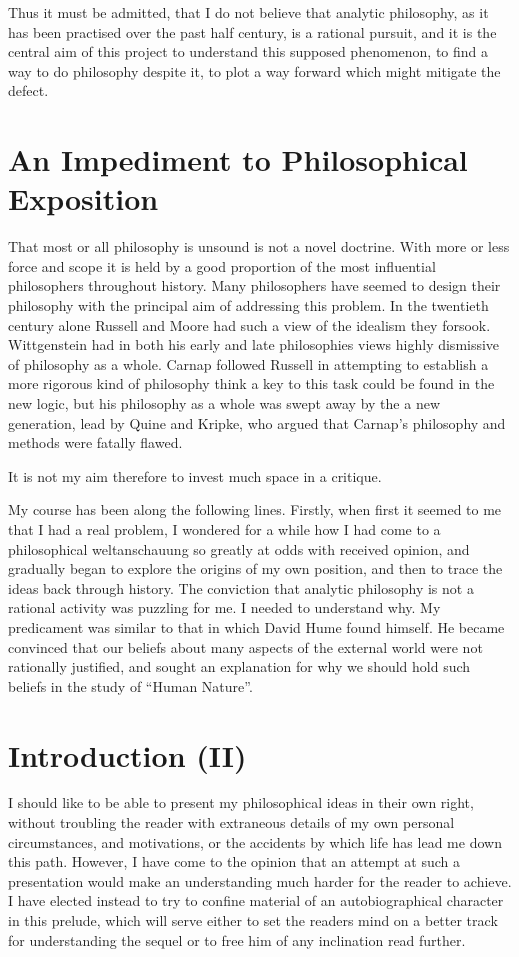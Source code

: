 Thus it must be admitted, that I do not believe that analytic philosophy, as it has been practised over the past half century, is a rational pursuit, and it is the central aim of this project to understand this supposed phenomenon, to find a way to do philosophy despite it, to plot a way forward which might mitigate the defect.

\section{An Impediment to Philosophical Exposition}

That most or all philosophy is unsound is not a novel doctrine.
With more or less force and scope it is held by a good proportion of the most influential philosophers throughout history.
Many philosophers have seemed to design their philosophy with the principal aim of addressing this problem.
In the twentieth century alone Russell and Moore had such a view of the idealism they forsook.
Wittgenstein had in both his early and late philosophies views highly dismissive of philosophy as a whole.
Carnap followed Russell in attempting to establish a more rigorous kind of philosophy think a key to this task could be found in the new logic, but his philosophy as a whole was swept away by the a new generation, lead by Quine and Kripke, who argued that Carnap's philosophy and methods were fatally flawed.

It is not my aim therefore to invest much space in a critique.

My course has been along the following lines.
Firstly, when first it seemed to me that I had a real problem, I wondered for a while how I had come to a philosophical weltanschauung so greatly at odds with received opinion, and gradually began to explore the origins of my own position, and then to trace the ideas back through history.
The conviction that analytic philosophy is not a rational activity was puzzling for me.
I needed to understand why.
My predicament was similar to that in which David Hume found himself.
He became convinced that our beliefs about many aspects of the external world were not rationally justified, and sought an explanation for why we should hold such beliefs in the study of ``Human Nature''.

\section{Introduction (II)}

I should like to be able to present my philosophical ideas in their own right, without troubling the reader with extraneous details of my own personal circumstances, and motivations, or the accidents by which life has lead me down this path.
However, I have come to the opinion that an attempt at such a presentation would make an understanding much harder for the reader to achieve.
I have elected instead to try to confine material of an autobiographical character in this prelude, which will serve either to set the readers mind on a better track for understanding the sequel or to free him of any inclination read further.


